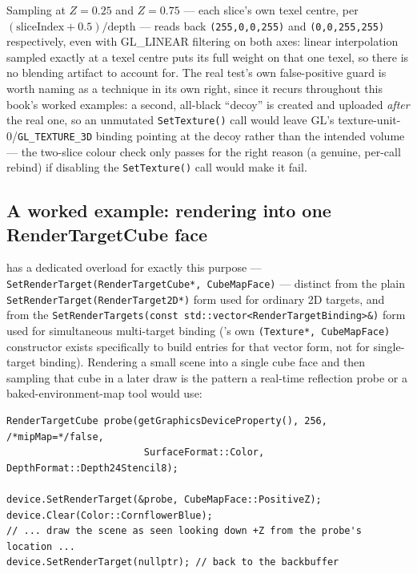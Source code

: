 Sampling at $Z=0.25$ and $Z=0.75$ --- each slice's own texel centre, per
$(\text{sliceIndex} + 0.5) / \text{depth}$ --- reads back \texttt{(255,0,0,255)} and
\texttt{(0,0,255,255)} respectively, even with GL\_LINEAR filtering on both axes: linear
interpolation sampled exactly at a texel centre puts its full weight on that one texel, so
there is no blending artifact to account for. The real test's own false-positive guard is
worth naming as a technique in its own right, since it recurs throughout this book's worked
examples: a second, all-black ``decoy''  is created and uploaded
\emph{after} the real one, so an unmutated \texttt{SetTexture()} call would leave GL's
texture-unit-0/\texttt{GL\_TEXTURE\_3D} binding pointing at the decoy rather than the
intended volume --- the two-slice colour check only passes for the right reason (a genuine,
per-call rebind) if disabling the \texttt{SetTexture()} call would make it fail.

\subsection{A worked example: rendering into one RenderTargetCube face}

 has a dedicated overload for exactly this purpose ---
\texttt{SetRenderTarget(RenderTargetCube*, CubeMapFace)} --- distinct from the plain
\texttt{SetRenderTarget(RenderTarget2D*)} form used for ordinary 2D targets, and from the
\texttt{SetRenderTargets(const std::vector<RenderTargetBinding>\&)} form used for
simultaneous multi-target binding ('s own
\texttt{(Texture*, CubeMapFace)} constructor exists specifically to build entries for that
vector form, not for single-target binding). Rendering a small scene into a single cube face
and then sampling that cube in a later draw is the pattern a real-time reflection probe or a
baked-environment-map tool would use:

\begin{lstlisting}
RenderTargetCube probe(getGraphicsDeviceProperty(), 256, /*mipMap=*/false,
                        SurfaceFormat::Color, DepthFormat::Depth24Stencil8);

device.SetRenderTarget(&probe, CubeMapFace::PositiveZ);
device.Clear(Color::CornflowerBlue);
// ... draw the scene as seen looking down +Z from the probe's location ...
device.SetRenderTarget(nullptr); // back to the backbuffer
\end{lstlisting}

